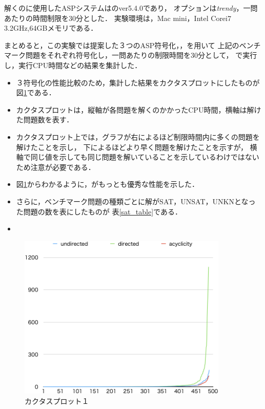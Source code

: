 解くのに使用したASPシステムは{\clingo}のver5.4.0であり，
オプションは\textit{trendy}，一問あたりの時間制限を30分とした．
実験環境は，Mac mini，Intel Corei7 3.2GHz,64GBメモリである．

まとめると，この実験では提案した３つのASP符号化，，を用いて
上記のベンチマーク問題をそれぞれ符号化し，一問あたりの制限時間を30分として，
{\clingo}で実行し，実行CPU時間などの結果を集計した．

\begin{itemize}
\item ３符号化の性能比較のため，集計した結果をカクタスプロットにしたものが図\ref{cactus}である．
\item カクタスプロットは，縦軸が各問題を解くのかかったCPU時間，横軸は解けた問題数を表す．
\item カクタスプロット上では，グラフが右によるほど制限時間内に多くの問題を解けたことを示し，
  下によるほどより早く問題を解けたことを示すが，
  横軸で同じ値を示しても同じ問題を解いていることを示しているわけではないため注意が必要である．
\item 図\ref{cactus}からわかるように，がもっとも優秀な性能を示した．
\end{itemize}

\begin{itemize}
\item さらに，ベンチマーク問題の種類ごとに解がSAT，UNSAT，UNKNとなった問題の数を表にしたものが
  表\ref{sat_table}である．
\item 
\end{itemize}

\begin{figure}[htbp]
\begin{center}
  \includegraphics[width=10cm]{fig/cactus.png}
\caption{カクタスプロット１}
\label{cactus}
\end{center}
\end{figure}

